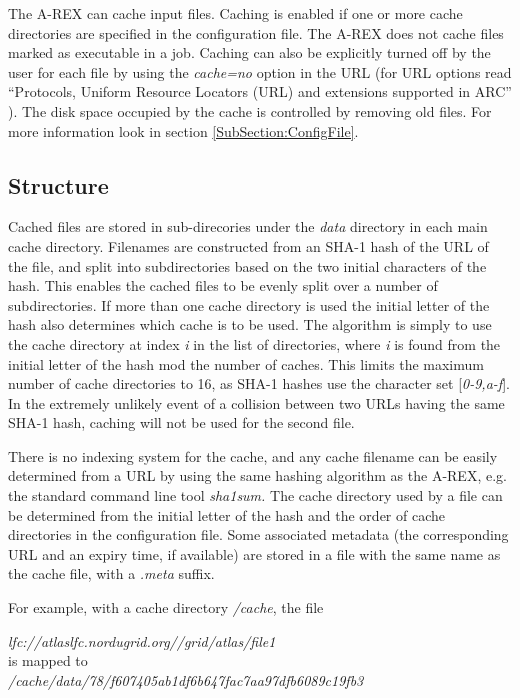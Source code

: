 \documentclass{article}                            %
\begin{document}
The A-REX can cache input files. Caching is enabled if one or more cache
directories are specified in the configuration file. The A-REX does not
cache files marked as executable in a job. Caching can also be explicitly
turned off by the user for each file by using the\textit{ cache=no}
option in the URL (for URL options read {}``Protocols, Uniform Resource
Locators (URL) and extensions supported in ARC'' \cite{urls}). The
disk space occupied by the cache is controlled by removing old files.
For more information look in section \ref{SubSection:ConfigFile}.


\subsection{Structure}

Cached files are stored in sub-direcories under the \emph{data} directory
in each main cache directory. Filenames are constructed from an SHA-1
hash of the URL of the file, and split into subdirectories based on
the two initial characters of the hash. This enables the cached files
to be evenly split over a number of subdirectories. If
more than one cache directory is used the initial letter of the hash
also determines which cache is to be used. The algorithm is simply
to use the cache directory at index \emph{i} in the list of directories,
where \emph{i} is found from the initial letter of the hash mod the
number of caches. This limits the maximum number of cache directories
to 16, as SHA-1 hashes use the character set {[}\emph{0-9,a-f}]. In
the extremely unlikely event of a collision between two URLs having
the same SHA-1 hash, caching will not be used for the second file.

There is no indexing system for the cache, and any cache filename
can be easily determined from a URL by using the same hashing algorithm
as the A-REX, e.g. the standard command line tool \emph{sha1sum. }The
cache directory used by a file can be determined from the initial
letter of the hash and the order of cache directories in the configuration
file. Some associated metadata (the corresponding URL and an expiry
time, if available) are stored in a file with the same name as the
cache file, with a \emph{.meta} suffix.

For example, with a cache directory \emph{/cache}, the file 

\begin{center}
\emph{lfc://atlaslfc.nordugrid.org//grid/atlas/file1 }\\
is mapped to\\
\emph{/cache/data/78/f607405ab1df6b647fac7aa97dfb6089c19fb3}
\par\end{center}
\end{document}
